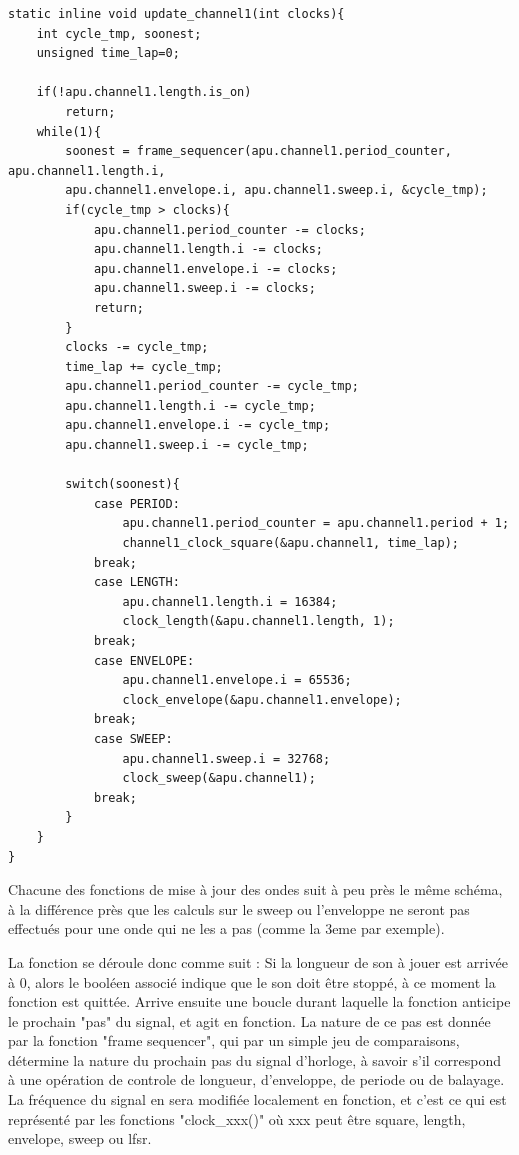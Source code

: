 \documentclass[french]{report}
\begin{document}
\begin{lstlisting}
static inline void update_channel1(int clocks){
	int cycle_tmp, soonest;
	unsigned time_lap=0;

	if(!apu.channel1.length.is_on)
		return;
	while(1){
		soonest = frame_sequencer(apu.channel1.period_counter, apu.channel1.length.i,
		apu.channel1.envelope.i, apu.channel1.sweep.i, &cycle_tmp);
		if(cycle_tmp > clocks){
			apu.channel1.period_counter -= clocks;
			apu.channel1.length.i -= clocks;
			apu.channel1.envelope.i -= clocks;
			apu.channel1.sweep.i -= clocks;
			return;
		}
		clocks -= cycle_tmp;
		time_lap += cycle_tmp;
		apu.channel1.period_counter -= cycle_tmp;
		apu.channel1.length.i -= cycle_tmp;
		apu.channel1.envelope.i -= cycle_tmp;
		apu.channel1.sweep.i -= cycle_tmp;
		
		switch(soonest){
			case PERIOD:
				apu.channel1.period_counter = apu.channel1.period + 1;
				channel1_clock_square(&apu.channel1, time_lap);
			break;
			case LENGTH:
				apu.channel1.length.i = 16384;
				clock_length(&apu.channel1.length, 1);
			break;
			case ENVELOPE:
				apu.channel1.envelope.i = 65536;
				clock_envelope(&apu.channel1.envelope);
			break;
			case SWEEP:
				apu.channel1.sweep.i = 32768;
				clock_sweep(&apu.channel1);
			break;
		}
	}
}
\end{lstlisting}

Chacune des fonctions de mise à jour des ondes suit à peu près le même schéma, à la différence près que les calculs sur le sweep ou l'enveloppe ne seront 
pas effectués pour une onde qui ne les a pas (comme la 3eme par exemple).

La fonction se déroule donc comme suit :
Si la longueur de son à jouer est arrivée à 0, alors le booléen associé indique que le son doit être stoppé, à ce moment la fonction est quittée.
Arrive ensuite une boucle durant laquelle la fonction anticipe le prochain "pas" du signal, et agit en fonction.
La nature de ce pas est donnée par la fonction "frame sequencer", qui par un simple jeu de comparaisons, détermine la nature du prochain pas du signal d'horloge, 
à savoir s'il correspond à une opération de controle de longueur, d'enveloppe, de periode ou de balayage.
La fréquence du signal en sera modifiée localement en fonction, et c'est ce qui est représenté par les fonctions "clock\_xxx()" où xxx peut être square, length, envelope, sweep ou lfsr.
\end{document}
